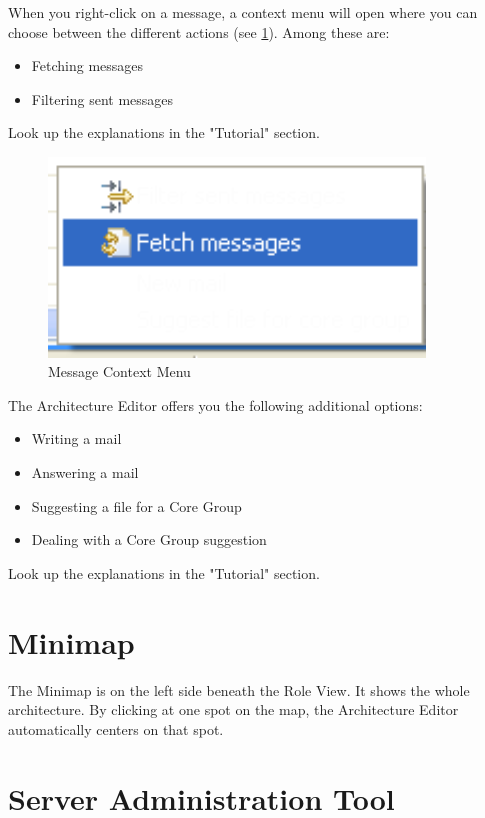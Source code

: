 When you right-click on a message, a context menu will open where you can choose 
between the different actions (see \ref{workflowkontext}). Among these are:

\begin{itemize}
	\item Fetching messages
	\item Filtering sent messages
\end{itemize}
Look up the explanations in the "Tutorial" section.

\begin{figure}[h!]
\begin{center}
\includegraphics[width=10cm]{workflowkontext.png}
   \caption{Message Context Menu}
\label{workflowkontext}
\end{center}
\end{figure}\par

The Architecture Editor offers you the following additional options:
\begin{itemize}
	\item Writing a mail
	\item Answering a mail
	\item Suggesting a file for a Core Group
	\item Dealing with a Core Group suggestion
\end{itemize}
Look up the explanations in the "Tutorial" section.

\section{Minimap}

The Minimap is on the left side beneath the Role View. It shows the whole architecture.
By clicking at one spot on the map, the Architecture Editor automatically centers on that
spot. 


\section{Server Administration Tool}

